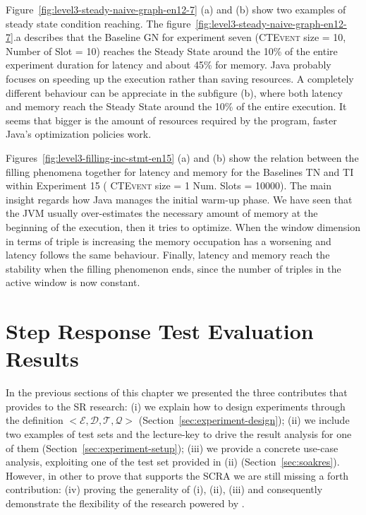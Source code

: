 Figure~\ref{fig:level3-steady-naive-graph-en12-7} (a) and (b) show two examples of steady state condition reaching. The figure~\ref{fig:level3-steady-naive-graph-en12-7}.a describes that the Baseline GN for experiment seven (\textsc{CTEvent} size = 10, Number of Slot = 10) reaches the Steady State around the 10\% of the entire experiment duration for latency and about 45\% for memory. 
Java probably focuses on speeding up the execution rather than saving resources. A completely different behaviour can be appreciate in the subfigure (b), where both latency and memory reach the Steady State around the 10\% of the entire execution. It seems that bigger is the amount of resources required by the program, faster Java's optimization policies work.

Figures~\ref{fig:level3-filling-inc-stmt-en15} (a) and (b) show the relation between the filling phenomena together for latency and memory for the Baselines TN and TI within Experiment 15 ( \textsc{CTEvent} size = 1 Num. Slots = 10000). The main insight regards how Java manages the initial warm-up phase. We have seen that the JVM usually over-estimates the necessary amount of memory at the beginning of the execution, then it tries to optimize. When the window dimension in terms of triple is increasing the memory occupation has a worsening and latency follows the same behaviour. Finally, latency and memory reach the stability when the filling phenomenon ends, since the number of triples in the active window is now constant.















\pagebreak

\section{Step Response Test Evaluation Results}\label{sec:stressres}

In the previous sections of this chapter we presented the three contributes that \name provides to the SR research: (i) we explain how to design experiments through the \name definition $<\mathcal{E},\mathcal{D},\mathcal{T},\mathcal{Q}>$ (Section~\ref{sec:experiment-design}); (ii) we include two examples of test sets and the lecture-key to drive the result analysis for one of them (Section~\ref{sec:experiment-setup}); (iii) we provide a concrete use-case analysis, exploiting one of the test set provided in (ii) (Section~\ref{sec:soakres}). However, in other to prove that \name supports the SCRA we are still missing a forth contribution: (iv) proving the generality of (i), (ii), (iii) and consequently demonstrate the flexibility of the research powered by \namens.

